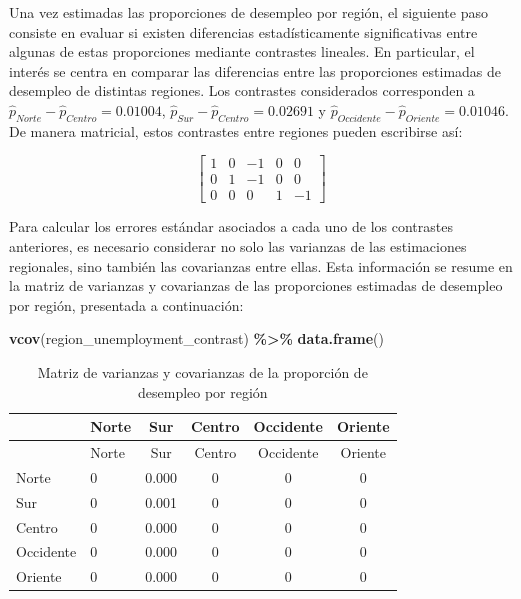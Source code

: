 \documentclass[
  spanish,
  12pt,
]{book}
\newenvironment{Shaded}{\begin{snugshade}}{\end{snugshade}}
\newcommand{\FunctionTok}[1]{\textcolor[rgb]{0.13,0.29,0.53}{\textbf{#1}}}
\newcommand{\NormalTok}[1]{#1}
\newcommand{\SpecialCharTok}[1]{\textcolor[rgb]{0.81,0.36,0.00}{\textbf{#1}}}
\begin{document}
Una vez estimadas las proporciones de desempleo por región, el siguiente paso consiste en evaluar si existen diferencias estadísticamente significativas entre algunas de estas proporciones mediante contrastes lineales. En particular, el interés se centra en comparar las diferencias entre las proporciones estimadas de desempleo de distintas regiones. Los contrastes considerados corresponden a \(\hat{p}_{Norte} - \hat{p}_{Centro} = 0.01004\), \(\hat{p}_{Sur} - \hat{p}_{Centro} = 0.02691\) y \(\hat{p}_{Occidente} - \hat{p}_{Oriente} = 0.01046\). De manera matricial, estos contrastes entre regiones pueden escribirse así:

\[
\left[\begin{array}{ccccc}
1 & 0 & -1 & 0 & 0\\
0 & 1 & -1 & 0 & 0\\
0 & 0 & 0 & 1 & -1
\end{array}\right]
\]

Para calcular los errores estándar asociados a cada uno de los contrastes anteriores, es necesario considerar no solo las varianzas de las estimaciones regionales, sino también las covarianzas entre ellas. Esta información se resume en la matriz de varianzas y covarianzas de las proporciones estimadas de desempleo por región, presentada a continuación:

\begin{Shaded}
\begin{Highlighting}[]
\FunctionTok{vcov}\NormalTok{(region\_unemployment\_contrast) }\SpecialCharTok{\%\textgreater{}\%}
  \FunctionTok{data.frame}\NormalTok{()}
\end{Highlighting}
\end{Shaded}

\begin{longtable}[]{@{}llcccc@{}}
\caption{\label{tab:tab-vcov-desempleo-region}Matriz de varianzas y covarianzas de la proporción de desempleo por región}\tabularnewline
\toprule\noalign{}
& Norte & Sur & Centro & Occidente & Oriente \\
\midrule\noalign{}
\endfirsthead
\toprule\noalign{}
& Norte & Sur & Centro & Occidente & Oriente \\
\midrule\noalign{}
\endhead
\bottomrule\noalign{}
\endlastfoot
Norte & 0 & 0.000 & 0 & 0 & 0 \\
Sur & 0 & 0.001 & 0 & 0 & 0 \\
Centro & 0 & 0.000 & 0 & 0 & 0 \\
Occidente & 0 & 0.000 & 0 & 0 & 0 \\
Oriente & 0 & 0.000 & 0 & 0 & 0 \\
\end{longtable}
\end{document}
